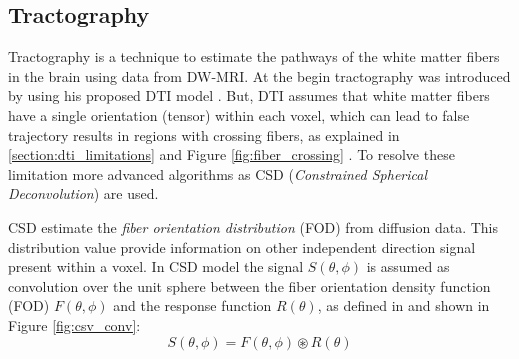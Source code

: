  \subsection{Tractography}
 Tractography is a technique to estimate the pathways of the white matter fibers in the brain using data from DW-MRI. At the begin tractography was introduced by \cite{basser1998fiber} using his proposed DTI model \cite{basser1994mr} \cite{basser2011microstructural}. But, DTI assumes that white matter fibers have a single orientation (tensor) within each voxel, which can lead to false trajectory results in regions with crossing fibers, as explained in \ref{section:dti_limitations} and Figure \ref{fig:fiber_crossing} \cite{basser2000vivo}. To resolve these limitation more advanced algorithms as CSD (\emph{Constrained Spherical Deconvolution}) \cite{tournier2007robust} are used.

 CSD estimate the \emph{fiber orientation distribution} (FOD) from diffusion data. This distribution value provide information on other independent direction signal present within a voxel. In CSD model the signal $S(\theta, \phi)$ is assumed as convolution over the unit sphere between the fiber orientation density function (FOD) $F(\theta, \phi)$ and the response function $R(\theta)$, as defined in \cite{tournier2004direct} and shown in Figure \ref{fig:csv_conv}: 
 \begin{equation}
   S(\theta, \phi) = F(\theta, \phi) \circledast R(\theta)
 \end{equation}

